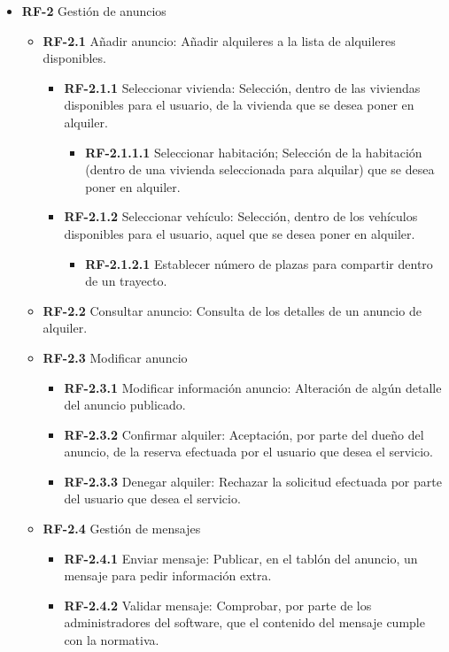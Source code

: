 \documentclass[11pt,spanish]{article} %
\begin{document}
\begin{itemize}
	\hspace{0.25cm}
	\item \textbf{RF-2} Gestión de anuncios
	\begin{itemize}
		\item \textbf{RF-2.1} Añadir anuncio: Añadir alquileres a la lista de alquileres disponibles.
		\begin{itemize}
			\item \textbf{RF-2.1.1} Seleccionar vivienda: Selección, dentro de las viviendas disponibles para el usuario, de la vivienda que se desea poner en alquiler.
			\begin{itemize}
				\item \textbf{RF-2.1.1.1} Seleccionar habitación;  Selección de la habitación (dentro de una vivienda seleccionada para alquilar) que se desea poner en alquiler.
			\end{itemize}
			\item \textbf{RF-2.1.2} Seleccionar vehículo: Selección, dentro de los vehículos disponibles para el usuario, aquel que se desea poner en alquiler.
			\begin{itemize}
				\item \textbf{RF-2.1.2.1} Establecer número de plazas para compartir dentro de un trayecto.
			\end{itemize}
		\end{itemize}
		\item \textbf{RF-2.2} Consultar anuncio: Consulta de los detalles de un anuncio de alquiler.
		\item \textbf{RF-2.3} Modificar anuncio
		\begin{itemize}
			\item \textbf{RF-2.3.1} Modificar información anuncio:  Alteración de algún detalle del anuncio publicado.
			\item \textbf{RF-2.3.2} Confirmar alquiler: Aceptación, por parte del dueño del anuncio, de la reserva efectuada por el usuario que desea el servicio.
			\item \textbf{RF-2.3.3} Denegar alquiler: Rechazar la solicitud efectuada por parte del usuario que desea el servicio.
		\end{itemize}
		\item \textbf{RF-2.4} Gestión de mensajes
		\begin{itemize}
			\item \textbf{RF-2.4.1} Enviar mensaje: Publicar, en el tablón del anuncio, un mensaje para pedir información extra.
			\item \textbf{RF-2.4.2} Validar mensaje: Comprobar, por parte de los administradores del software, que el contenido del mensaje cumple con la normativa.

\end{itemize}
\end{itemize}
\end{itemize}
\end{document}
